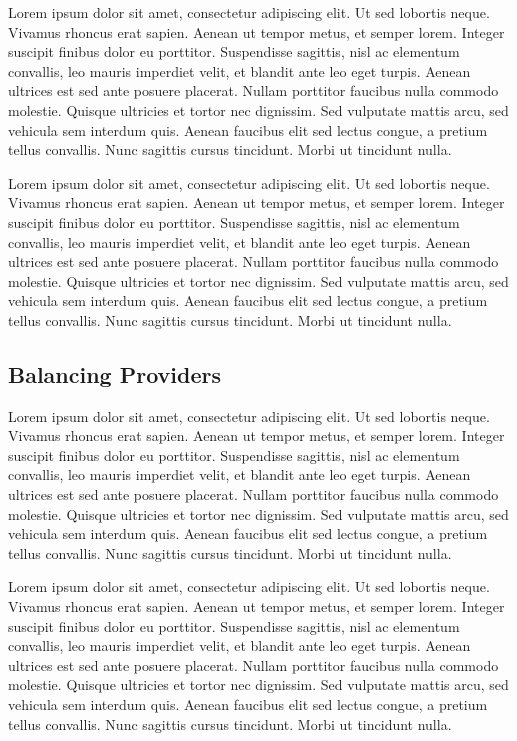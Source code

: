 Lorem ipsum dolor sit amet, consectetur adipiscing elit. Ut sed lobortis neque. Vivamus rhoncus erat sapien. Aenean ut tempor metus, et semper lorem. Integer suscipit finibus dolor eu porttitor. Suspendisse sagittis, nisl ac elementum convallis, leo mauris imperdiet velit, et blandit ante leo eget turpis. Aenean ultrices est sed ante posuere placerat. Nullam porttitor faucibus nulla commodo molestie. Quisque ultricies et tortor nec dignissim. Sed vulputate mattis arcu, sed vehicula sem interdum quis. Aenean faucibus elit sed lectus congue, a pretium tellus convallis. Nunc sagittis cursus tincidunt. Morbi ut tincidunt nulla.

Lorem ipsum dolor sit amet, consectetur adipiscing elit. Ut sed lobortis neque. Vivamus rhoncus erat sapien. Aenean ut tempor metus, et semper lorem. Integer suscipit finibus dolor eu porttitor. Suspendisse sagittis, nisl ac elementum convallis, leo mauris imperdiet velit, et blandit ante leo eget turpis. Aenean ultrices est sed ante posuere placerat. Nullam porttitor faucibus nulla commodo molestie. Quisque ultricies et tortor nec dignissim. Sed vulputate mattis arcu, sed vehicula sem interdum quis. Aenean faucibus elit sed lectus congue, a pretium tellus convallis. Nunc sagittis cursus tincidunt. Morbi ut tincidunt nulla.

\subsection{Balancing Providers}
Lorem ipsum dolor sit amet, consectetur adipiscing elit. Ut sed lobortis neque. Vivamus rhoncus erat sapien. Aenean ut tempor metus, et semper lorem. Integer suscipit finibus dolor eu porttitor. Suspendisse sagittis, nisl ac elementum convallis, leo mauris imperdiet velit, et blandit ante leo eget turpis. Aenean ultrices est sed ante posuere placerat. Nullam porttitor faucibus nulla commodo molestie. Quisque ultricies et tortor nec dignissim. Sed vulputate mattis arcu, sed vehicula sem interdum quis. Aenean faucibus elit sed lectus congue, a pretium tellus convallis. Nunc sagittis cursus tincidunt. Morbi ut tincidunt nulla.

Lorem ipsum dolor sit amet, consectetur adipiscing elit. Ut sed lobortis neque. Vivamus rhoncus erat sapien. Aenean ut tempor metus, et semper lorem. Integer suscipit finibus dolor eu porttitor. Suspendisse sagittis, nisl ac elementum convallis, leo mauris imperdiet velit, et blandit ante leo eget turpis. Aenean ultrices est sed ante posuere placerat. Nullam porttitor faucibus nulla commodo molestie. Quisque ultricies et tortor nec dignissim. Sed vulputate mattis arcu, sed vehicula sem interdum quis. Aenean faucibus elit sed lectus congue, a pretium tellus convallis. Nunc sagittis cursus tincidunt. Morbi ut tincidunt nulla.

